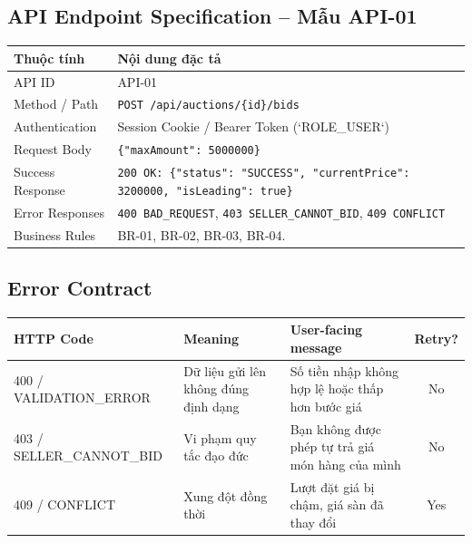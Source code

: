 \documentclass[11pt,a4paper]{article}
\begin{document}
\subsection{API Endpoint Specification -- Mẫu API-01}
\begin{table}[H]
    \centering
    \small
    \begin{tabularx}{\textwidth}{|l|X|}
        \hline
        \textbf{Thuộc tính} & \textbf{Nội dung đặc tả} \\ \hline
        API ID & API-01 \\ \hline
        Method / Path & \verb|POST /api/auctions/{id}/bids| \\ \hline
        Authentication & Session Cookie / Bearer Token (`ROLE_USER`) \\ \hline
        Request Body & \verb|{"maxAmount": 5000000}| \\ \hline
        Success Response & \verb|200 OK: {"status": "SUCCESS", "currentPrice": 3200000, "isLeading": true}| \\ \hline
        Error Responses & \verb|400 BAD_REQUEST|, \verb|403 SELLER_CANNOT_BID|, \verb|409 CONFLICT| \\ \hline
        Business Rules & BR-01, BR-02, BR-03, BR-04. \\ \hline
    \end{tabularx}
\end{table}

\subsection{Error Contract}
\begin{table}[H]
    \centering
    \small
    \begin{tabularx}{\textwidth}{|l|l|X|c|}
        \hline
        \textbf{HTTP Code} & \textbf{Meaning} & \textbf{User-facing message} & \textbf{Retry?} \\ \hline
        400 / VALIDATION\_ERROR & Dữ liệu gửi lên không đúng định dạng & Số tiền nhập không hợp lệ hoặc thấp hơn bước giá & No \\ \hline
        403 / SELLER\_CANNOT\_BID & Vi phạm quy tắc đạo đức & Bạn không được phép tự trả giá món hàng của mình & No \\ \hline
        409 / CONFLICT & Xung đột đồng thời & Lượt đặt giá bị chậm, giá sàn đã thay đổi & Yes \\ \hline
    \end{tabularx}
\end{table}
\end{document}
